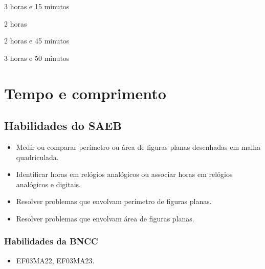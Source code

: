 \begin{escolha}
\item
  3 horas e 15 minutos
\item
  2 horas 
\item
  2 horas e 45 minutos
\item
  3 horas e 50 minutos
\end{escolha}


\chapter{Tempo e comprimento}
\enlargethispage{6\baselineskip}

\vspace*{-1.5cm}

\section*{Habilidades do SAEB}

\begin{itemize}
\item Medir ou comparar perímetro ou área de figuras planas desenhadas em malha quadriculada.

\item Identificar horas em relógios analógicos ou associar horas em relógios analógicos e digitais.

\item Resolver problemas que envolvam perímetro de figuras planas.

\item Resolver problemas que envolvam área de figuras planas.
\end{itemize}

\subsection{Habilidades da BNCC}

\begin{itemize}
 \item  EF03MA22, EF03MA23.
\end{itemize}


